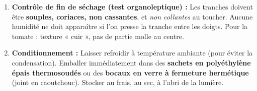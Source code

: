 \documentclass[11pt]{article}
\begin{document}
\begin{methode}
\begin{enumerate}
\begin{itemize}
    \end{itemize}
    \item \textbf{Contrôle de fin de séchage (test organoleptique) :} Les tranches doivent être \textbf{souples, coriaces, non cassantes}, et \emph{non collantes} au toucher. Aucune humidité ne doit apparaître si l'on presse la tranche entre les doigts. Pour la tomate : texture « cuir », pas de partie molle au centre.
    \item \textbf{Conditionnement :} Laisser refroidir à température ambiante (pour éviter la condensation). Emballer immédiatement dans des \textbf{sachets en polyéthylène épais thermosoudés} ou des \textbf{bocaux en verre à fermeture hermétique} (joint en caoutchouc). Stocker au frais, au sec, à l'abri de la lumière.
\end{enumerate}
\end{methode}
\end{document}
